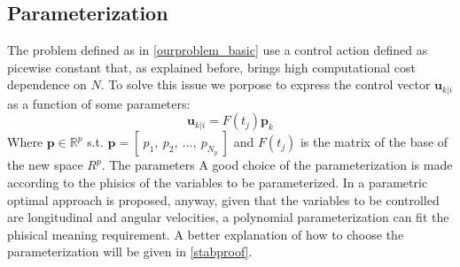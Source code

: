 \subsection{Parameterization}

The problem defined as in \ref{ourproblem_basic} use a control action defined as picewise constant that, as explained before, brings high computational cost dependence on $N$. To solve this issue we porpose to express the control vector $\textbf{u}_{k|i}$ as a function of some parameters:
\begin{equation}\label{param_eq}
\textbf{u}_{k|i}=F(t_j)\textbf{p}_k
\end{equation}
Where $\textbf{p} \in \mathbb{R}^p$ s.t. $\textbf{p}=[\ p_1,\ p_2,\ \dots,\ p_{N_p}\ ]$ and $F(t_j)$ is the matrix of the base of the new space $R^p$. The parameters  A good choice of the parameterization is made according to the phisics of the variables to be parameterized. In \cite{kelly2013mobile} a parametric optimal approach is proposed, anyway, given that the variables to be controlled are longitudinal and angular velocities, a polynomial parameterization can fit the phisical meaning requirement. A better explanation of how to choose the parameterization will be given in \ref{stabproof}.

